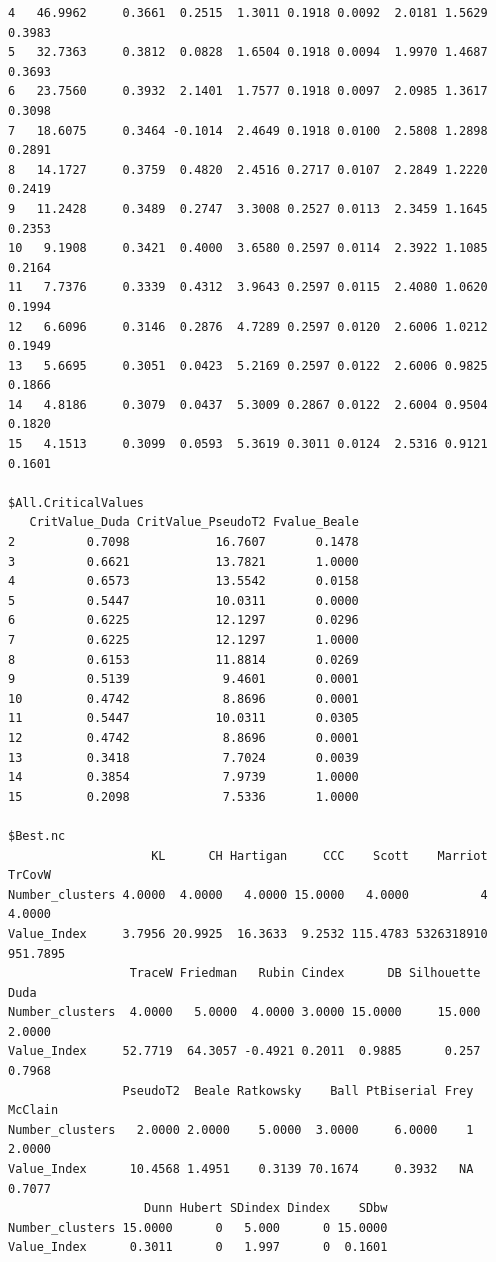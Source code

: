 \documentclass[
]{article}
\begin{document}
\begin{verbatim}
4   46.9962     0.3661  0.2515  1.3011 0.1918 0.0092  2.0181 1.5629 0.3983
5   32.7363     0.3812  0.0828  1.6504 0.1918 0.0094  1.9970 1.4687 0.3693
6   23.7560     0.3932  2.1401  1.7577 0.1918 0.0097  2.0985 1.3617 0.3098
7   18.6075     0.3464 -0.1014  2.4649 0.1918 0.0100  2.5808 1.2898 0.2891
8   14.1727     0.3759  0.4820  2.4516 0.2717 0.0107  2.2849 1.2220 0.2419
9   11.2428     0.3489  0.2747  3.3008 0.2527 0.0113  2.3459 1.1645 0.2353
10   9.1908     0.3421  0.4000  3.6580 0.2597 0.0114  2.3922 1.1085 0.2164
11   7.7376     0.3339  0.4312  3.9643 0.2597 0.0115  2.4080 1.0620 0.1994
12   6.6096     0.3146  0.2876  4.7289 0.2597 0.0120  2.6006 1.0212 0.1949
13   5.6695     0.3051  0.0423  5.2169 0.2597 0.0122  2.6006 0.9825 0.1866
14   4.8186     0.3079  0.0437  5.3009 0.2867 0.0122  2.6004 0.9504 0.1820
15   4.1513     0.3099  0.0593  5.3619 0.3011 0.0124  2.5316 0.9121 0.1601

$All.CriticalValues
   CritValue_Duda CritValue_PseudoT2 Fvalue_Beale
2          0.7098            16.7607       0.1478
3          0.6621            13.7821       1.0000
4          0.6573            13.5542       0.0158
5          0.5447            10.0311       0.0000
6          0.6225            12.1297       0.0296
7          0.6225            12.1297       1.0000
8          0.6153            11.8814       0.0269
9          0.5139             9.4601       0.0001
10         0.4742             8.8696       0.0001
11         0.5447            10.0311       0.0305
12         0.4742             8.8696       0.0001
13         0.3418             7.7024       0.0039
14         0.3854             7.9739       1.0000
15         0.2098             7.5336       1.0000

$Best.nc
                    KL      CH Hartigan     CCC    Scott    Marriot   TrCovW
Number_clusters 4.0000  4.0000   4.0000 15.0000   4.0000          4   4.0000
Value_Index     3.7956 20.9925  16.3633  9.2532 115.4783 5326318910 951.7895
                 TraceW Friedman   Rubin Cindex      DB Silhouette   Duda
Number_clusters  4.0000   5.0000  4.0000 3.0000 15.0000     15.000 2.0000
Value_Index     52.7719  64.3057 -0.4921 0.2011  0.9885      0.257 0.7968
                PseudoT2  Beale Ratkowsky    Ball PtBiserial Frey McClain
Number_clusters   2.0000 2.0000    5.0000  3.0000     6.0000    1  2.0000
Value_Index      10.4568 1.4951    0.3139 70.1674     0.3932   NA  0.7077
                   Dunn Hubert SDindex Dindex    SDbw
Number_clusters 15.0000      0   5.000      0 15.0000
Value_Index      0.3011      0   1.997      0  0.1601


\end{verbatim}
\end{document}
